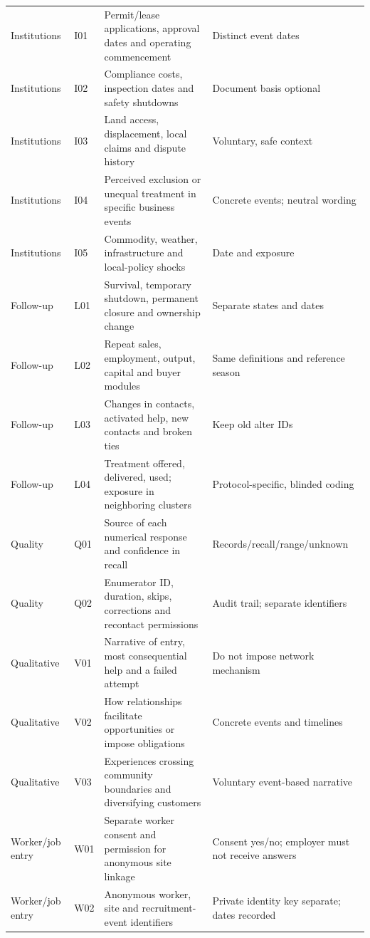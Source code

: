 \documentclass[11pt,a4paper]{report}
\begin{document}
\begin{longtable}{>{\raggedright\arraybackslash}p{1.8cm}l>{\raggedright\arraybackslash}p{7.5cm}>{\raggedright\arraybackslash}p{4.5cm}}
Institutions & I01 & Permit/\allowbreak{}lease applications, approval dates and operating commencement & Distinct event dates \\
Institutions & I02 & Compliance costs, inspection dates and safety shutdowns & Document basis optional \\
Institutions & I03 & Land access, displacement, local claims and dispute history & Voluntary, safe context \\
Institutions & I04 & Perceived exclusion or unequal treatment in specific business events & Concrete events; neutral wording \\
Institutions & I05 & Commodity, weather, infrastructure and local-policy shocks & Date and exposure \\
Follow-up & L01 & Survival, temporary shutdown, permanent closure and ownership change & Separate states and dates \\
Follow-up & L02 & Repeat sales, employment, output, capital and buyer modules & Same definitions and reference season \\
Follow-up & L03 & Changes in contacts, activated help, new contacts and broken ties & Keep old alter IDs \\
Follow-up & L04 & Treatment offered, delivered, used; exposure in neighboring clusters & Protocol-specific, blinded coding \\
Quality & Q01 & Source of each numerical response and confidence in recall & Records/\allowbreak{}recall/\allowbreak{}range/\allowbreak{}unknown \\
Quality & Q02 & Enumerator ID, duration, skips, corrections and recontact permissions & Audit trail; separate identifiers \\
Qualitative & V01 & Narrative of entry, most consequential help and a failed attempt & Do not impose network mechanism \\
Qualitative & V02 & How relationships facilitate opportunities or impose obligations & Concrete events and timelines \\
Qualitative & V03 & Experiences crossing community boundaries and diversifying customers & Voluntary event-based narrative \\
Worker/\allowbreak{}job entry & W01 & Separate worker consent and permission for anonymous site linkage & Consent yes/\allowbreak{}no; employer must not receive answers \\
Worker/\allowbreak{}job entry & W02 & Anonymous worker, site and recruitment-event identifiers & Private identity key separate; dates recorded \\

\end{longtable}
\end{document}
